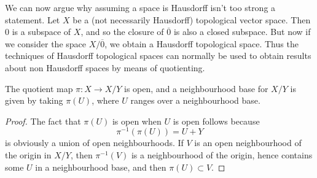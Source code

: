 We can now argue why assuming a space is Hausdorff isn't too strong a statement. Let $X$ be a (not necessarily Hausdorff) topological vector space. Then $0$ is a subspace of $X$, and so the closure of $\overline{0}$ is also a closed subspace. But now if we consider the space $X/\overline{0}$, we obtain a Hausdorff topological space. Thus the techniques of Hausdorff topological spaces can normally be used to obtain results about non Hausdorff spaces by means of quotienting.

\begin{theorem}
    The quotient map $\pi: X \to X/Y$ is open, and a neighbourhood base for $X/Y$ is given by taking $\pi(U)$, where $U$ ranges over a neighbourhood base.
\end{theorem}
\begin{proof}
    The fact that $\pi(U)$ is open when $U$ is open follows because
    \[ \pi^{-1}(\pi(U)) = U + Y \]
    is obviously a union of open neighbourhoods. If $V$ is an open neighbourhood of the origin in $X/Y$, then $\pi^{-1}(V)$ is a neighbourhood of the origin, hence contains some $U$ in a neighbourhood base, and then $\pi(U) \subset V$.
\end{proof}

